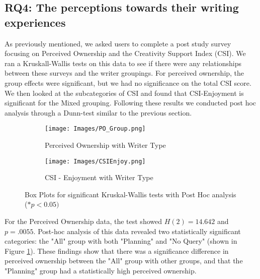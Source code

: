\documentclass[manuscript,screen,acmsmall]{acmart}
\begin{document}
\subsection{RQ4: The perceptions towards their writing experiences}

    As previously mentioned, we asked users to complete a post study survey focusing on Perceived Ownership and the Creativity Support Index (CSI). We ran a Kruskall-Wallis tests on this data to see if there were any relationships between these surveys and the writer groupings. For perceived ownership, the group effects were significant, but we had no significance on the total CSI score. We then looked at the subcategories of CSI and found that CSI-Enjoyment is significant for the Mixed grouping. Following these results we conducted post hoc analysis through a Dunn-test similar to the previous section.  

\begin{figure}[h!]
    \centering
    \begin{subfigure}[b]{0.45\textwidth} 
        \centering
        \texttt{[image: Images/PO\_Group.png]}
        \caption{Perceived Ownership with Writer Type}
        \label{fig:PO_Box_Plot}
    \end{subfigure}
    \hfill 
    \begin{subfigure}[b]{0.45\textwidth}
         \centering
    \texttt{[image: Images/CSIEnjoy.png]}
    \caption{CSI - Enjoyment with Writer Type}
    \label{fig:CSI_Box_Plot}
    \end{subfigure}
    \caption{Box Plots for significant Kruskal-Wallis tests with Post Hoc analysis ($* p < 0.05)$}
    \label{fig:post_study_box}
\end{figure}

    For the Perceived Ownership data, the test showed $H(2) = 14.642$ and $p = .0055$. Post-hoc analysis of this data revealed two statistically significant categories: the "All" group with both "Planning" and "No Query" (shown in Figure \ref{fig:PO_Box_Plot}).
    These findings show that there was a significance difference in perceived ownership between the "All" group with other groups, and that the "Planning" group had a statistically high perceived ownership.

\end{document}
